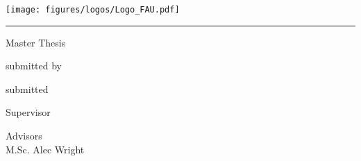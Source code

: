 \begin{titlepage}
\begin{localsize}{11}
\begin{center}
\begin{center}
\vspace*{0.5cm}

\texttt{[image: figures/logos/Logo\_FAU.pdf]}
\end{center}
\vspace{0.0cm}
\noindent\rule{16cm}{1pt}

\vspace{1cm}
{{\Large Master Thesis}}

\vspace{1cm}
{\myTitle}

\vspace{0.5cm}
{\small{submitted by}\\
\vspace{0.2cm}
\Large{\myName}}

\vspace{0.5cm}
{\small{submitted}\\
\vspace{0.2cm}
\Large{\myTime}

\vspace{1.5cm}}
{\small{Supervisor}\\
\vspace{0.2cm}
\Large \mySupervisor}

\vspace{0.5cm}
{\small Advisors}\\
\vspace{0.2cm}
{\Large M.Sc. Alec Wright\\
\vspace{0.15cm}
\myOtherProf}
\end{center}

\vspace{5cm}


\end{localsize}
\end{titlepage}
